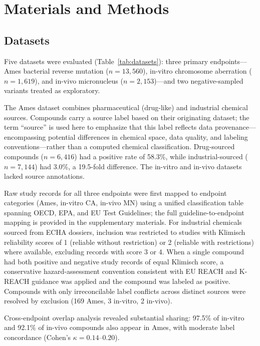 \section{Materials and Methods}

\subsection{Datasets}

Five datasets were evaluated (Table~\ref{tab:datasets}): three primary endpoints---Ames bacterial reverse mutation ($n = 13{,}560$), 
in-vitro chromosome aberration ($n = 1{,}619$), and in-vivo micronucleus ($n = 2{,}153$)---and two negative-sampled variants treated as exploratory.

The Ames dataset combines pharmaceutical (drug-like) and industrial chemical sources. 
Compounds carry a source label based on their originating dataset; the term ``source'' is used here to emphasize that this label reflects data provenance---encompassing potential differences in chemical space,
data quality, and labeling conventions---rather than a computed chemical classification. Drug-sourced compounds ($n = 6{,}416$) had a positive rate of 58.3\%,
while industrial-sourced ($n = 7{,}144$) had 3.0\%, a 19.5-fold difference. The in-vitro and in-vivo datasets lacked source annotations.

Raw study records for all three endpoints were first mapped to endpoint categories (Ames, in-vitro CA, in-vivo MN) using a unified classification table spanning OECD, EPA, 
and EU Test Guidelines; the full guideline-to-endpoint mapping is provided in the supplementary materials. For industrial chemicals sourced from ECHA dossiers,
inclusion was restricted to studies with Klimisch reliability scores of 1 (reliable without restriction) or 2 (reliable with restrictions) where available,\cite{Klimisch_1997} 
excluding records with score 3 or 4. When a single compound had both positive and negative study records of equal Klimisch score, a conservative hazard-assessment convention consistent 
with EU REACH and K-REACH guidance\cite{EU_REACH_2006,K_REACH_2018} was applied and the compound was labeled as positive. 
Compounds with only irreconcilable label conflicts across distinct sources were resolved by exclusion (169 Ames, 3 in-vitro, 2 in-vivo).


Cross-endpoint overlap analysis revealed substantial sharing: 97.5\% of in-vitro and 92.1\% of in-vivo compounds also appear in Ames, with moderate label concordance (Cohen's $\kappa = 0.14$--$0.20$).

